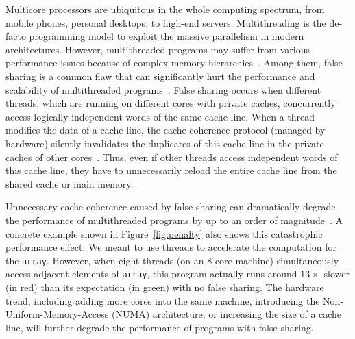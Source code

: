 Multicore processors are ubiquitous in the whole computing spectrum, from mobile phones, personal desktops, to high-end servers. Multithreading is the de-facto programming model to exploit the massive parallelism in modern architectures.
However, multithreaded programs may suffer from various performance issues because of complex memory hierarchies~\cite{ibs-sc,ibs-sc2,Dramon}. Among them, false sharing is a common flaw that can significantly hurt the performance and scalability of multithreaded programs~\cite{falseshare:effect}. False sharing occurs when different threads, which are running on different cores with private caches, concurrently access logically independent words of the same cache line. When a thread modifies the data of a cache line, the cache coherence protocol (managed by hardware) silently invalidates the duplicates of this cache line in the private caches of other cores~\cite{MESI}. Thus, even if other threads access independent words of this cache line, they have to unnecessarily reload the entire cache line from the shared cache or main memory. 

Unnecessary cache coherence caused by false sharing can dramatically degrade the performance of multithreaded programs by up to an order of magnitude~\cite{falseshare:effect}. A concrete example shown in Figure~\ref{fig:penalty} also shows this catastrophic performance effect. We meant to use threads to accelerate the computation for the {\tt array}. However, when eight threads (on an 8-core machine) simultaneously access adjacent elements of {\tt array}, this program actually runs around $13\times$ slower (in red) than its expectation (in green) with no false sharing.
The hardware trend, including adding more cores into the same machine, introducing the Non-Uniform-Memory-Access (NUMA) architecture, or increasing the size of a cache line, will further degrade the performance of programs with false sharing.

